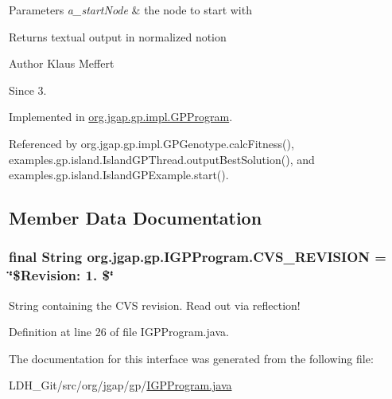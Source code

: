 \begin{DoxyParams}{Parameters}
{\em a\-\_\-start\-Node} & the node to start with \\
\hline
\end{DoxyParams}
\begin{DoxyReturn}{Returns}
textual output in normalized notion
\end{DoxyReturn}
\begin{DoxyAuthor}{Author}
Klaus Meffert 
\end{DoxyAuthor}
\begin{DoxySince}{Since}
3. 
\end{DoxySince}


Implemented in \hyperlink{classorg_1_1jgap_1_1gp_1_1impl_1_1_g_p_program_a88fcd847e2fe1955ea9607b2c0b2d814}{org.\-jgap.\-gp.\-impl.\-G\-P\-Program}.



Referenced by org.\-jgap.\-gp.\-impl.\-G\-P\-Genotype.\-calc\-Fitness(), examples.\-gp.\-island.\-Island\-G\-P\-Thread.\-output\-Best\-Solution(), and examples.\-gp.\-island.\-Island\-G\-P\-Example.\-start().



\subsection{Member Data Documentation}
\hypertarget{interfaceorg_1_1jgap_1_1gp_1_1_i_g_p_program_a9b256f58b194a88fdc5bd5e47c33f83d}{
\subsubsection[{C\-V\-S\-\_\-\-R\-E\-V\-I\-S\-I\-O\-N}]{\setlength{\rightskip}{0pt plus 5cm}final String org.\-jgap.\-gp.\-I\-G\-P\-Program.\-C\-V\-S\-\_\-\-R\-E\-V\-I\-S\-I\-O\-N = \char`\"{}\$Revision\-: 1. \$\char`\"{}\hspace{0.3cm}{\ttfamily [static]}}}\label{interfaceorg_1_1jgap_1_1gp_1_1_i_g_p_program_a9b256f58b194a88fdc5bd5e47c33f83d}
String containing the C\-V\-S revision. Read out via reflection! 

Definition at line 26 of file I\-G\-P\-Program.\-java.



The documentation for this interface was generated from the following file\-:\begin{DoxyCompactItemize}
\item 
L\-D\-H\-\_\-\-Git/src/org/jgap/gp/\hyperlink{_i_g_p_program_8java}{I\-G\-P\-Program.\-java}\end{DoxyCompactItemize}
